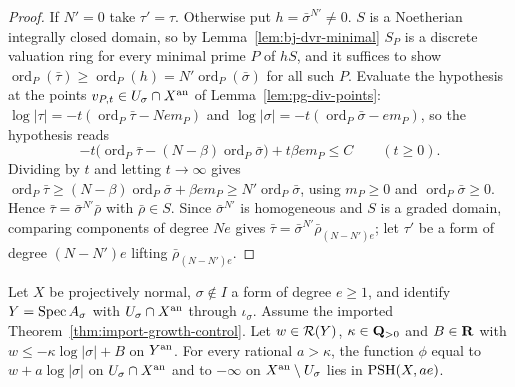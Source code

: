 \begin{proof}
If $N'=0$ take $\tau'=\tau$. Otherwise put $h=\bar\sigma^{N'}\ne0$. $S$ is a Noetherian integrally closed domain, so by
Lemma~\ref{lem:bj-dvr-minimal} $S_P$ is a discrete valuation ring for every minimal prime $P$ of $hS$, and it suffices to show
$\operatorname{ord}_P(\bar\tau)\ge\operatorname{ord}_P(h)=N'\operatorname{ord}_P(\bar\sigma)$ for all such $P$. Evaluate the hypothesis at the points $v_{P,t}\in
U_\sigma\cap X^{\mathrm{an}}$ of Lemma~\ref{lem:pg-div-points}: $\log|\tau|=-t(\operatorname{ord}_P\bar\tau-Nem_P)$ and
$\log|\sigma|=-t(\operatorname{ord}_P\bar\sigma-em_P)$, so the hypothesis reads
\[
-t\bigl(\operatorname{ord}_P\bar\tau-(N-\beta)\operatorname{ord}_P\bar\sigma\bigr)+t\beta em_P\le C\qquad(t\ge0).
\]
Dividing by $t$ and letting $t\to\infty$ gives $\operatorname{ord}_P\bar\tau\ge(N-\beta)\operatorname{ord}_P\bar\sigma+\beta em_P\ge
N'\operatorname{ord}_P\bar\sigma$, using $m_P\ge0$ and $\operatorname{ord}_P\bar\sigma\ge0$. Hence $\bar\tau=\bar\sigma^{N'}\bar\rho$ with $\bar\rho\in S$.
Since $\bar\sigma^{N'}$ is homogeneous and $S$ is a graded domain, comparing components of degree $Ne$ gives
$\bar\tau=\bar\sigma^{N'}\bar\rho_{(N-N')e}$; let $\tau'$ be a form of degree $(N-N')e$ lifting $\bar\rho_{(N-N')e}$.
\end{proof}

\begin{lemma}\label{lem:pg-compactification-extend}
\leanok
{}
Let $X$ be projectively normal, $\sigma\notin I$ a form of degree $e\ge1$, and identify $Y=\operatorname{Spec} A_\sigma$ with $U_\sigma\cap X^{\mathrm{an}}$ through
$\iota_\sigma$. Assume the imported Theorem~\ref{thm:import-growth-control}. Let $w\in\mathcal{R}(Y)$, $\kappa\in\mathbf{Q}_{>0}$ and $B\in\mathbf{R}$ with
$w\le-\kappa\log|\sigma|+B$ on $Y^{\mathrm{an}}$. For every rational $a>\kappa$, the function $\phi$ equal to $w+a\log|\sigma|$ on
$U_\sigma\cap X^{\mathrm{an}}$ and to $-\infty$ on $X^{\mathrm{an}}\setminus U_\sigma$ lies in $\operatorname{PSH}(X,ae)$.
\end{lemma}

